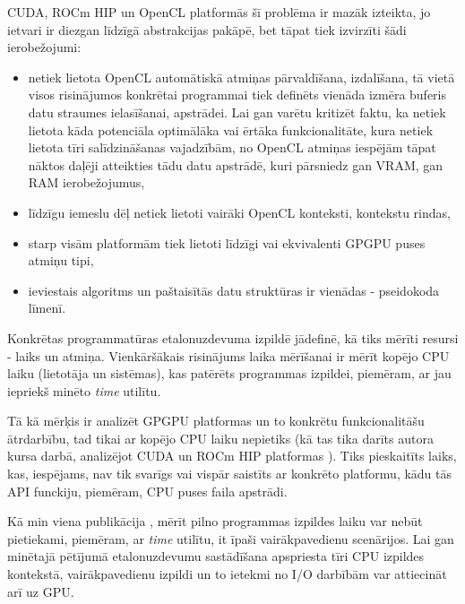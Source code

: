 CUDA, ROCm HIP un OpenCL platformās šī problēma ir mazāk izteikta, jo ietvari
ir diezgan līdzīgā abstrakcijas pakāpē, bet tāpat tiek izvirzīti šādi
ierobežojumi:
\begin{itemize}
    \item netiek lietota OpenCL automātiskā atmiņas pārvaldīšana, izdalīšana,
        tā vietā visos risinājumos konkrētai programmai tiek definēts vienāda
        izmēra buferis datu straumes ielasīšanai, apstrādei. Lai gan varētu kritizēt
        faktu, ka netiek lietota kāda potenciāla optimālāka  vai ērtāka
        funkcionalitāte, kura netiek lietota tīri salīdzināšanas vajadzībām, no
        OpenCL atmiņas iespējām tāpat nāktos daļēji atteikties tādu datu
        apstrādē, kuri pārsniedz gan VRAM, gan RAM ierobežojumus,
    \item līdzīgu iemeslu dēļ netiek lietoti vairāki OpenCL konteksti,
        kontekstu rindas,
    \item starp visām platformām tiek lietoti līdzīgi vai ekvivalenti GPGPU
        puses atmiņu tipi,
    \item ieviestais algoritms un paštaisītās datu struktūras ir vienādas -
        pseidokoda līmenī.
\end{itemize}

Konkrētas programmatūras etalonuzdevuma izpildē jādefinē, kā tiks mērīti
resursi - laiks un atmiņa. Vienkāršākais risinājums laika mērīšanai ir mērīt
kopējo CPU laiku (lietotāja un sistēmas), kas patērēts programmas izpildei, 
piemēram, ar jau iepriekš minēto \textit{time} utilītu.

Tā kā mērķis ir analizēt GPGPU platformas un to konkrētu funkcionalitāšu
ātrdarbību, tad tikai ar kopējo CPU laiku nepietiks (kā tas tika darīts autora
kursa darbā, analizējot CUDA un ROCm HIP platformas \cite{kursa-darbs}). Tiks
pieskaitīts laiks, kas, iespējams, nav tik svarīgs vai vispār saistīts ar
konkrēto platformu, kādu tās API funckiju, piemēram, CPU puses faila apstrādi.

Kā min viena publikācija \cite{reliable-benchmarking}, mērīt pilno programmas
izpildes laiku var nebūt pietiekami, piemēram, ar \textit{time} utilītu, it
īpaši vairākpavedienu scenārijos. Lai gan minētajā pētījumā etalonuzdevumu
sastādīšana apspriesta tīri CPU izpildes kontekstā, vairākpavedienu izpildi un
to ietekmi no I/O darbībām var attiecināt arī uz GPU.

